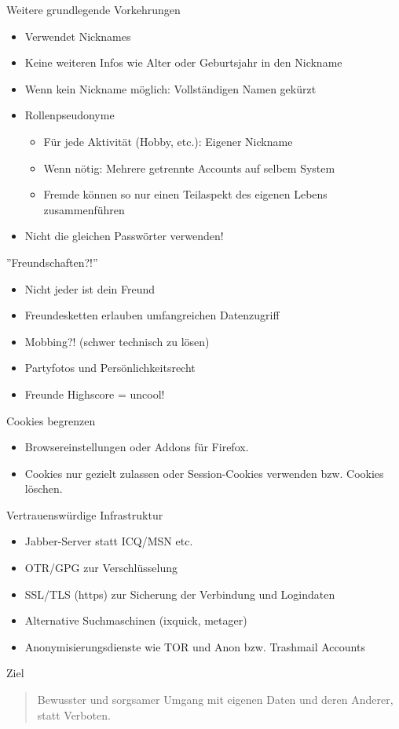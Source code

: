 \begin{frame}{Weitere grundlegende Vorkehrungen}
	\begin{itemize}
		\item Verwendet Nicknames
		\item Keine weiteren Infos wie Alter oder Geburtsjahr in den Nickname
		\item Wenn kein Nickname möglich: Vollständigen Namen gekürzt
		\item Rollenpseudonyme
		\begin{itemize}
			\item Für jede Aktivität (Hobby, etc.): Eigener Nickname
			\item Wenn nötig: Mehrere getrennte Accounts auf selbem System
			\item Fremde können so nur einen Teilaspekt des eigenen Lebens zusammenführen
		\end{itemize}
		\item Nicht die gleichen Passw\"orter verwenden!
	\end{itemize}
\end{frame}

\begin{frame}{''Freundschaften?!''}
	\begin{itemize}
		\item Nicht jeder ist dein Freund
		\item Freundesketten erlauben umfangreichen Datenzugriff
		\item Mobbing?! (schwer technisch zu l\"osen)
		\item Partyfotos und Pers\"onlichkeitsrecht
		\item Freunde Highscore = uncool!
	\end{itemize}
\end{frame}


\begin{frame}{Cookies begrenzen}
	\begin{itemize}
		\item Browsereinstellungen oder Addons f\"ur Firefox.
		\item Cookies nur gezielt zulassen oder Session-Cookies verwenden bzw. Cookies l\"oschen.
	\end{itemize}
\end{frame}

\begin{frame}{Vertrauenswürdige Infrastruktur}
	\begin{itemize}
		\item Jabber-Server statt ICQ/MSN etc.
		\item OTR/GPG zur Verschl\"usselung
		\item SSL/TLS (https) zur Sicherung der Verbindung und Logindaten
		\item Alternative Suchmaschinen (ixquick, metager)
		\item Anonymisierungsdienste wie TOR und Anon bzw. Trashmail Accounts
	\end{itemize}
\end{frame}

\begin{frame}{Ziel}
	\begin{quotation}
		Bewusster und sorgsamer Umgang mit eigenen Daten und deren Anderer, statt Verboten.
	\end{quotation}
\end{frame}


